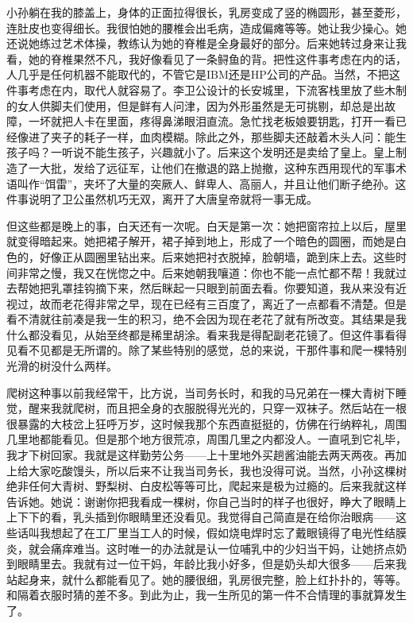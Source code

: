 小孙躺在我的膝盖上，身体的正面拉得很长，乳房变成了竖的椭圆形，甚至菱形，连肚皮也变得细长。我很怕她的腰椎会出毛病，造成偏瘫等等。她让我少操心。她还说她练过艺术体操，教练认为她的脊椎是全身最好的部分。后来她转过身来让我看，她的脊椎果然不凡，我好像看见了一条鲟鱼的背。把性这件事考虑在内的话，人几乎是任何机器不能取代的，不管它是IBM还是HP公司的产品。当然，不把这件事考虑在内，取代人就容易了。李卫公设计的长安城里，下流客栈里放了些木制的女人供脚夫们使用，但是鲜有人问津，因为外形虽然是无可挑剔，却总是出故障，一坏就把人卡在里面，疼得鼻涕眼泪直流。急忙找老板娘要钥匙，打开一看已经像进了夹子的耗子一样，血肉模糊。除此之外，那些脚夫还敲着木头人问：能生孩子吗？一听说不能生孩子，兴趣就小了。后来这个发明还是卖给了皇上。皇上制造了一大批，发给了远征军，让他们在撤退的路上抛撤，这种东西用现代的军事术语叫作“饵雷”，夹坏了大量的突厥人、鲜卑人、高丽人，并且让他们断子绝孙。这件事说明了卫公虽然机巧无双，离开了大唐皇帝就将一事无成。 

但这些都是晚上的事，白天还有一次呢。白天是第一次：她把窗帘拉上以后，屋里就变得暗起来。她把裙子解开，裙子掉到地上，形成了一个暗色的圆圈，而她是白色的，好像正从圆圈里钻出来。后来她把衬衣脱掉，脸朝墙，跪到床上去。这些时间非常之慢，我又在恍惚之中。后来她朝我嚷道：你也不能一点忙都不帮！我就过去帮她把乳罩挂钩摘下来，然后眯起一只眼到前面去看。你要知道，我从来没有近视过，故而老花得非常之早，现在已经有三百度了，离近了一点都看不清楚。但是看不清就往前凑是我一生的积习，绝不会因为现在老花了就有所改变。其结果是我什么都没看见，从始至终都是稀里胡涂。看来我是得配副老花镜了。但这件事看得见看不见都是无所谓的。除了某些特别的感觉，总的来说，干那件事和爬一棵特别光滑的树没什么两样。 

爬树这种事以前我经常干，比方说，当司务长时，和我的马兄弟在一棵大青树下睡觉，醒来我就爬树，而且把全身的衣服脱得光光的，只穿一双袜子。然后站在一根很暴露的大枝岔上狂呼万岁，这时候我那个东西直挺挺的，仿佛在行纳粹礼，周围几里地都能看见。但是那个地方很荒凉，周围几里之内都没人。一直吼到它礼毕，我才下树回家。我就是这样勤劳公务——上十里地外买趟酱油能去两天两夜。再加上给大家吃酸馒头，所以后来不让我当司务长，我也没得可说。当然，小孙这棵树绝非任何大青树、野梨树、白皮松等等可比，爬起来是极为过瘾的。后来我就这样告诉她。她说：谢谢你把我看成一棵树，你自己当时的样子也很好，睁大了眼睛上上下下的看，乳头插到你眼睛里还没看见。我觉得自己简直是在给你治眼病——这些话叫我想起了在工厂里当工人的时候，假如烧电焊时忘了戴眼镜得了电光性结膜炎，就会痛痒难当。这时唯一的办法就是认一位哺乳中的少妇当干妈，让她挤点奶到眼睛里去。我就有过一位干妈，年龄比我小好多，但是奶头却大很多——后来我站起身来，就什么都能看见了。她的腰很细，乳房很完整，脸上红扑扑的，等等。和隔着衣服时猜的差不多。到此为止，我一生所见的第一件不合情理的事就算发生了。 

